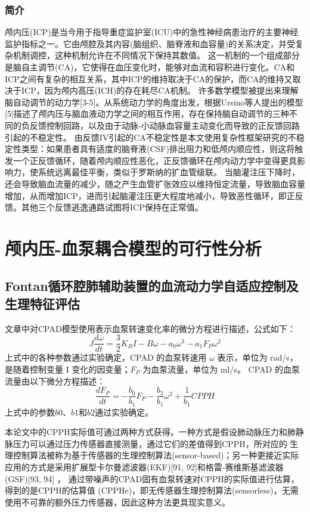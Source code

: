 \documentclass[titlepage,12pt]{article}
\begin{document}
\subsubsection{简介}
颅内压(ICP)是当今用于指导重症监护室(ICU)中的急性神经病患治疗的主要神经监护指标之一。它由颅腔及其内容(脑组织、脑脊液和血容量)的关系决定，并受复杂机制调控，这种机制允许在不同情况下保持其数值。
这一机制的一个组成部分是脑自主调节(CA)，它使得在血压变化时，能够对血流和容积进行变化。CA和ICP之间有复杂的相互关系，其中ICP的维持取决于CA的保护，而CA的维持又取决于ICP，因为颅内高压(ICH)的存在耗尽CA机制。
许多数学模型被提出来理解脑自动调节的动力学[3-5]。从系统动力学的角度出发，根据Ursino等人提出的模型[5]描述了颅内压与脑血液动力学之间的相互作用，存在保持脑自动调节的三种不同的负反馈控制回路，以及由于动脉-小动脉血容量主动变化而导致的正反馈回路引起的不稳定性。
由反馈IV引起的CA不稳定性是本文使用复杂性框架研究的不稳定性类型：如果患者具有适度的脑脊液(CSF)排出阻力和低颅内顺应性，则这将触发一个正反馈循环，随着颅内顺应性恶化，正反馈循环在颅内动力学中变得更具影响力，使系统远离最佳平衡，类似于罗斯纳的扩血管级联。
当脑灌注压下降时，还会导致脑血流量的减少，随之产生血管扩张效应以维持恒定流量，导致脑血容量增加，从而增加ICP，进而引起脑灌注压更大程度地减小，导致恶性循环，即正反馈。其他三个反馈逃逸通路试图将ICP保持在正常值。

\section{颅内压-血泵耦合模型的可行性分析}
\subsection{Fontan循环腔肺辅助装置的血流动力学自适应控制及生理特征评估}
文章中对CPAD模型使用表示血泵转速变化率的微分方程进行描述，公式如下：
\begin{equation*}
    J \frac{d\omega}{dt} = \frac{3}{2} K_B I - B \omega - a_0 \omega^3 - a_1 F_P \omega^2
\end{equation*}
上式中的各种参数通过实验确定，CPAD 的血泵转速用 $\omega$ 表示，单位为 rad/s，是随着控制变量 I 变化的因变量；$F_P$ 为血泵流量，单位为 ml/s。
CPAD 的血泵流量由以下微分方程描述：
\begin{equation*}
    \frac{dF_P}{dt} = -\frac{b_0}{b_1} F_P - \frac{b_2}{b_1} \omega^2 + \frac{1}{b_1} CPPH
\end{equation*}
上式中的参数$b0$、$b1$和$b2$通过实验确定。

本论文中的CPPH实际值可通过两种方式获得。一种方式是假设肺动脉压力和肺静脉压力可以通过压力传感器直接测量，通过它们的差值得到CPPH，所对应的  生理控制算法被称为基于传感器的生理控制算法(sensor-based)；另一种更接近实际应用的方式是采用扩展型卡尔曼滤波器(EKF)[91, 92]和格雷-赛维斯基滤波器(GSF)[93, 94] ，  通过带噪声的CPAD固有血泵转速对CPPH的实际值进行估算，得到的是CPPH的估算值 (CPPHe)，即无传感器生理控制算法(sensorless)，无需使用不可靠的额外压力传感器，因此这种方法更具现实意义。
\end{document}
